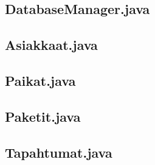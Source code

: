 \documentclass[11pt,a4paper]{article}
\begin{document}
\subsection*{DatabaseManager.java}

\newpage

\subsection*{Asiakkaat.java}

\newpage

\subsection*{Paikat.java}

\newpage

\subsection*{Paketit.java}

\newpage

\subsection*{Tapahtumat.java}

\end{document}
